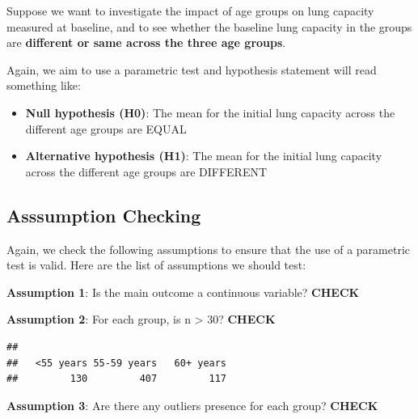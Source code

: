 \documentclass[
]{book}
\newenvironment{Shaded}{\begin{snugshade}}{\end{snugshade}}
\newcommand{\AttributeTok}[1]{\textcolor[rgb]{0.77,0.63,0.00}{#1}}
\newcommand{\CommentTok}[1]{\textcolor[rgb]{0.56,0.35,0.01}{\textit{#1}}}
\newcommand{\FunctionTok}[1]{\textcolor[rgb]{0.00,0.00,0.00}{#1}}
\newcommand{\NormalTok}[1]{#1}
\newcommand{\SpecialCharTok}[1]{\textcolor[rgb]{0.00,0.00,0.00}{#1}}
\newcommand{\StringTok}[1]{\textcolor[rgb]{0.31,0.60,0.02}{#1}}
\begin{document}
Suppose we want to investigate the impact of age groups on lung capacity measured at baseline, and to see whether the baseline lung capacity in the groups are \textbf{different or same across the three age groups}.

Again, we aim to use a parametric test and hypothesis statement will read something like:

\begin{itemize}
\item
  \textbf{Null hypothesis (H0)}: The mean for the initial lung capacity across the different age groups are EQUAL
\item
  \textbf{Alternative hypothesis (H1)}: The mean for the initial lung capacity across the different age groups are DIFFERENT
\end{itemize}

\hypertarget{asssumption-checking}{%
\subsection{Asssumption Checking}\label{asssumption-checking}}

Again, we check the following assumptions to ensure that the use of a parametric test is valid. Here are the list of assumptions we should test:

\textbf{Assumption 1}: Is the main outcome a continuous variable? \textbf{CHECK}

\textbf{Assumption 2}: For each group, is n \textgreater{} 30? \textbf{CHECK}

\begin{Shaded}
\end{Shaded}

\begin{verbatim}
## 
##   <55 years 55-59 years   60+ years 
##         130         407         117
\end{verbatim}

\textbf{Assumption 3}: Are there any outliers presence for each group? \textbf{CHECK}

\begin{Shaded}
\end{Shaded}
\end{document}
